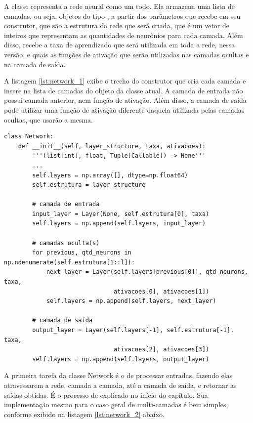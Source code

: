 A classe  representa a rede neural como um todo. Ela armazena uma lista de camadas, ou seja, objetos do tipo , a partir dos parâmetros que recebe em seu construtor, que são a estrutura da rede que será criada, que é um vetor de inteiros que representam as quantidades de neurônios para cada camada. Além disso, recebe a taxa de aprendizado que será utilizada em toda a rede, nessa versão, e quais as funções de ativação que serão utilizadas nas camadas ocultas e na camada de saída.

A listagem \ref{lst:network_1} exibe o trecho do construtor que cria cada camada e insere na lista de camadas do objeto da classe atual. A camada de entrada não possui camada anterior, nem função de ativação. Além disso, a camada de saída pode utilizar uma função de ativação diferente daquela utilizada pelas camadas ocultas, que usarão a mesma.

\begin{scriptsize}
\estiloR
\begin{lstlisting}[caption={Trecho da classe \eng{Network}}, label={lst:network_1}, escapeinside={\%}]
class Network:
    def __init__(self, layer_structure, taxa, ativacoes):
        '''(list[int], float, Tuple[Callable]) -> None'''
        ...
        self.layers = np.array([], dtype=np.float64)
        self.estrutura = layer_structure

        # camada de entrada
        input_layer = Layer(None, self.estrutura[0], taxa)
        self.layers = np.append(self.layers, input_layer)

        # camadas oculta(s)
        for previous, qtd_neurons in np.ndenumerate(self.estrutura[1::l]):
            next_layer = Layer(self.layers[previous[0]], qtd_neurons, taxa,
                               ativacoes[0], ativacoes[1])
            self.layers = np.append(self.layers, next_layer)

        # camada de saída
        output_layer = Layer(self.layers[-1], self.estrutura[-1], taxa,
                               ativacoes[2], ativacoes[3])
        self.layers = np.append(self.layers, output_layer)
\end{lstlisting}
\end{scriptsize}

A primeira tarefa da classe Network é o de processar entradas, fazendo elas atravessarem a rede, camada a camada, até a camada de saída, e retornar as saídas obtidas. É o processo de  explicado no início do capítulo. Sua implementação mesmo para o caso geral de multi-camadas é bem simples, conforme exibido na listagem \ref{lst:network_2} abaixo.

